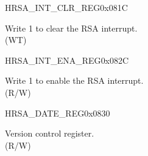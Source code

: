 \begin{register}{H}{RSA\_INT\_CLR\_REG}{0x081C}\label{regdesc:RSAINTCLRREG}
%
%
\regnewline%
\begin{regdesc}\begin{reglist}
\label{fielddesc:RSACLEARINTERRUPT}\item [RSA\_CLEAR\_INTERRUPT] Write 1 to clear the RSA interrupt. \\
(WT)
\end{reglist}\end{regdesc}
\end{register}


\begin{register}{H}{RSA\_INT\_ENA\_REG}{0x082C}\label{regdesc:RSAINTENAREG}
%
%
\regnewline%
\begin{regdesc}\begin{reglist}
\label{fielddesc:RSAINTENA}\item [RSA\_INT\_ENA] Write 1 to enable the RSA interrupt.\\
(R/W)
\end{reglist}\end{regdesc}
\end{register}


\begin{register}{H}{RSA\_DATE\_REG}{0x0830}\label{regdesc:RSADATEREG}
%
%
\regnewline%
\begin{regdesc}\begin{reglist}
\label{fielddesc:RSADATE}\item [RSA\_DATE] Version control register. \\
(R/W)
\end{reglist}\end{regdesc}
\end{register}


